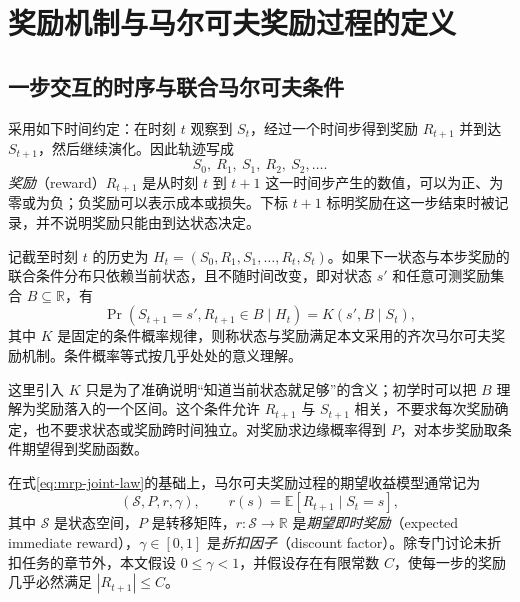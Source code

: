 \documentclass[UTF8,12pt,a4paper,fontset=fandol]{ctexart}
\begin{document}
\section{奖励机制与马尔可夫奖励过程的定义}
\label{sec:mrp-definition}

\subsection{一步交互的时序与联合马尔可夫条件}

采用如下时间约定：在时刻 $t$ 观察到 $S_t$，经过一个时间步得到奖励 $R_{t+1}$ 并到达 $S_{t+1}$，然后继续演化。因此轨迹写成
\[
  S_0,\ R_1,\ S_1,\ R_2,\ S_2,\ldots.
\]
\emph{奖励}（reward）$R_{t+1}$ 是从时刻 $t$ 到 $t+1$ 这一时间步产生的数值，可以为正、为零或为负；负奖励可以表示成本或损失。下标 $t+1$ 标明奖励在这一步结束时被记录，并不说明奖励只能由到达状态决定。

\begin{definition}[齐次马尔可夫奖励机制]
记截至时刻 $t$ 的历史为 $H_t=(S_0,R_1,S_1,\ldots,R_t,S_t)$。如果下一状态与本步奖励的联合条件分布只依赖当前状态，且不随时间改变，即对状态 $s'$ 和任意可测奖励集合 $B\subseteq\mathbb R$，有
\begin{equation}
  \Pr(S_{t+1}=s',R_{t+1}\in B\mid H_t)
  =K(s',B\mid S_t),
  \label{eq:mrp-joint-law}
\end{equation}
其中 $K$ 是固定的条件概率规律，则称状态与奖励满足本文采用的齐次马尔可夫奖励机制。条件概率等式按几乎处处的意义理解。
\end{definition}

这里引入 $K$ 只是为了准确说明“知道当前状态就足够”的含义；初学时可以把 $B$ 理解为奖励落入的一个区间。这个条件允许 $R_{t+1}$ 与 $S_{t+1}$ 相关，不要求每次奖励确定，也不要求状态或奖励跨时间独立。对奖励求边缘概率得到 $P$，对本步奖励取条件期望得到奖励函数。

\begin{definition}[期望收益模型的四元组]
在式\eqref{eq:mrp-joint-law}的基础上，马尔可夫奖励过程的期望收益模型通常记为
\begin{equation}
  (\mathcal S,P,r,\gamma),\qquad
  r(s)=\mathbb E[R_{t+1}\mid S_t=s],
  \label{eq:mrp-tuple}
\end{equation}
其中 $\mathcal S$ 是状态空间，$P$ 是转移矩阵，$r:\mathcal S\to\mathbb R$ 是\emph{期望即时奖励}（expected immediate reward），$\gamma\in[0,1]$ 是\emph{折扣因子}（discount factor）。除专门讨论未折扣任务的章节外，本文假设 $0\leq\gamma<1$，并假设存在有限常数 $C$，使每一步的奖励几乎必然满足 $|R_{t+1}|\leq C$。
\end{definition}
\end{document}
